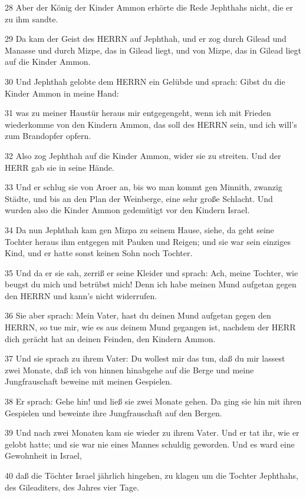 \par 28 Aber der König der Kinder Ammon erhörte die Rede Jephthahs nicht, die er zu ihm sandte.
\par 29 Da kam der Geist des HERRN auf Jephthah, und er zog durch Gilead und Manasse und durch Mizpe, das in Gilead liegt, und von Mizpe, das in Gilead liegt auf die Kinder Ammon.
\par 30 Und Jephthah gelobte dem HERRN ein Gelübde und sprach: Gibst du die Kinder Ammon in meine Hand:
\par 31 was zu meiner Haustür heraus mir entgegengeht, wenn ich mit Frieden wiederkomme von den Kindern Ammon, das soll des HERRN sein, und ich will's zum Brandopfer opfern.
\par 32 Also zog Jephthah auf die Kinder Ammon, wider sie zu streiten. Und der HERR gab sie in seine Hände.
\par 33 Und er schlug sie von Aroer an, bis wo man kommt gen Minnith, zwanzig Städte, und bis an den Plan der Weinberge, eine sehr große Schlacht. Und wurden also die Kinder Ammon gedemütigt vor den Kindern Israel.
\par 34 Da nun Jephthah kam gen Mizpa zu seinem Hause, siehe, da geht seine Tochter heraus ihm entgegen mit Pauken und Reigen; und sie war sein einziges Kind, und er hatte sonst keinen Sohn noch Tochter.
\par 35 Und da er sie sah, zerriß er seine Kleider und sprach: Ach, meine Tochter, wie beugst du mich und betrübst mich! Denn ich habe meinen Mund aufgetan gegen den HERRN und kann's nicht widerrufen.
\par 36 Sie aber sprach: Mein Vater, hast du deinen Mund aufgetan gegen den HERRN, so tue mir, wie es aus deinem Mund gegangen ist, nachdem der HERR dich gerächt hat an deinen Feinden, den Kindern Ammon.
\par 37 Und sie sprach zu ihrem Vater: Du wollest mir das tun, daß du mir lassest zwei Monate, daß ich von hinnen hinabgehe auf die Berge und meine Jungfrauschaft beweine mit meinen Gespielen.
\par 38 Er sprach: Gehe hin! und ließ sie zwei Monate gehen. Da ging sie hin mit ihren Gespielen und beweinte ihre Jungfrauschaft auf den Bergen.
\par 39 Und nach zwei Monaten kam sie wieder zu ihrem Vater. Und er tat ihr, wie er gelobt hatte; und sie war nie eines Mannes schuldig geworden. Und es ward eine Gewohnheit in Israel,
\par 40 daß die Töchter Israel jährlich hingehen, zu klagen um die Tochter Jephthahs, des Gileaditers, des Jahres vier Tage.

